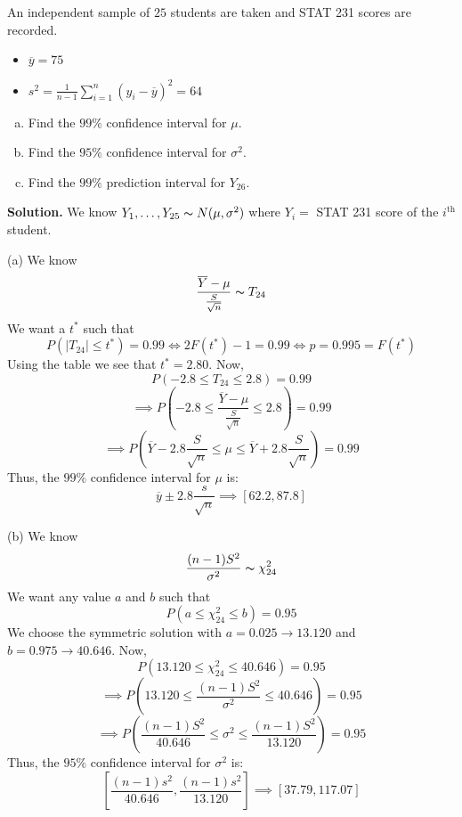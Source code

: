 \begin{exbox}
    \begin{example}
        An independent sample of $ 25 $ students are taken and STAT 231 scores are recorded.
        \begin{itemize}
            \item $ \overline{y}=75 $
            \item $ s^2=\frac{1}{n-1} \sum\limits_{i=1}^{n} (y_i-\overline{y})^2=64 $
        \end{itemize}
        \begin{enumerate}[(a)]
            \item Find the $ 99\% $ confidence interval for $ \mu $.
            \item Find the $ 95\% $ confidence interval for $ \sigma^2 $.
            \item Find the $ 99\% $ prediction interval for $ Y_{26} $.
        \end{enumerate}
        \textbf{Solution.} We know $ Y_1,\ldots ,Y_{25} \thicksim N(\mu,\sigma^2) $
        where $ Y_i= $ STAT 231 score of the $ i^{\text{th}} $ student.

        (a) We know
        \[ \frac{\overline{Y}-\mu}{\frac{S}{\sqrt{n}}} \thicksim T_{24} \]
        We want a $ t^* $ such that
        \[ P(|T_{24}|\leqslant t^*)=0.99\iff 2F(t^*)-1=0.99\iff p=0.995=F(t^*) \]
        Using the table we see that $ t^*=2.80 $. Now,
        \[ P(-2.8\leqslant T_{24}\leqslant 2.8)=0.99 \]
        \[ \implies P\left(-2.8\leqslant \frac{\overline{Y}-\mu}{\frac{S}{\sqrt{n}}}
            \leqslant 2.8\right)=0.99 \]
        \[ \implies P\left(\overline{Y}-2.8 \frac{S}{\sqrt{n}}\leqslant \mu\leqslant \overline{Y}+
            2.8 \frac{S}{\sqrt{n}}\right)=0.99 \]
        Thus, the $ 99\% $ confidence interval for $ \mu $ is:
        \[ \overline{y}\pm 2.8 \frac{s}{\sqrt{n}}\implies \left[ 62.2, 87.8 \right] \]

        (b) We know
        \[ \frac{(n-1)S^2}{\sigma^2} \thicksim \chi^2_{24}  \]
        We want any value $ a $ and $ b $ such that
        \[ P(a\leqslant \chi^2_{24}\leqslant b)=0.95 \]
        We choose the symmetric solution with $ a=0.025\rightarrow 13.120 $ and $ b=0.975\rightarrow 40.646 $.
        Now,
        \[ P\left( 13.120\leqslant \chi^2_{24}\leqslant 40.646 \right)=0.95 \]
        \[ \implies P\left( 13.120\leqslant \frac{(n-1) S^2}{\sigma^2}\leqslant 40.646 \right)=0.95 \]
        \[ \implies P\left( \frac{(n-1)S^2}{40.646}\leqslant \sigma^2 \leqslant \frac{(n-1)S^2}{13.120} \right)=0.95 \]
        Thus, the $ 95\% $ confidence interval for $ \sigma^2 $ is:
        \[ \left[ \frac{(n-1)s^2}{40.646} , \frac{(n-1)s^2}{13.120} \right]\implies
            \left[ 37.79, 117.07 \right] \]


\end{example}
\end{exbox}
